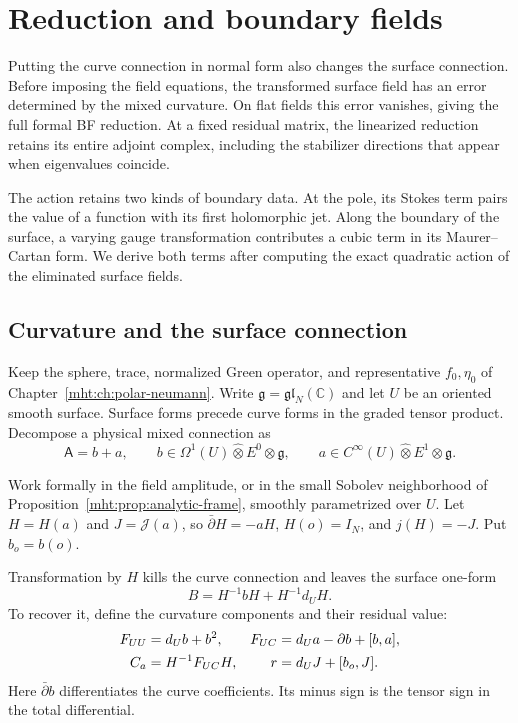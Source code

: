\chapter{Reduction and boundary fields}
\label{mht:ch:neumann-bv}

Putting the curve connection in normal form also changes the surface
connection. Before imposing the field equations, the transformed surface
field has an error determined by the mixed curvature. On flat fields
this error vanishes, giving the full formal BF reduction. At a fixed
residual matrix, the linearized reduction retains its entire adjoint
complex, including the stabilizer directions that appear when
eigenvalues coincide.

The action retains two kinds of boundary data. At the pole, its Stokes
term pairs the value of a function with its first holomorphic jet.
Along the boundary of the surface, a varying gauge transformation
contributes a cubic term in its Maurer--Cartan form. We derive both
terms after computing the exact quadratic action of the eliminated
surface fields.

\section{Curvature and the surface connection}

Keep the sphere, trace, normalized Green operator, and representative
$f_0,\eta_0$ of Chapter~\ref{mht:ch:polar-neumann}.
Write $\mathfrak g=\mathfrak{gl}_N(\mathbb C)$ and let $U$ be an oriented
smooth surface. Surface forms precede curve forms in the graded tensor
product. Decompose a physical mixed connection as
\[
 \mathsf A=b+a,\qquad
 b\in\Omega^1(U)\widehat\otimes E^0\otimes\mathfrak g,\qquad
 a\in C^\infty(U)\widehat\otimes E^1\otimes\mathfrak g.
\]

Work formally in the field amplitude, or in the small Sobolev
neighborhood of Proposition~\ref{mht:prop:analytic-frame}, smoothly
parametrized over $U$. Let $H=H(a)$ and $J=\mathcal J(a)$, so
$\bar\partial H=-aH$, $H(o)=I_N$, and $j(H)=-J$.
Put $b_o=b(o)$.

Transformation by $H$ kills the curve connection and leaves the surface
one-form
\begin{equation}\label{mht:eq:surface-frame}
 B=H^{-1}bH+H^{-1}d_UH.
\end{equation}
To recover it, define the curvature components and their residual value:
\begin{align}
 F_{UU}&=d_Ub+b^2,&
 F_{UC}&=d_Ua-\bar\partial b+[b,a],\label{mht:eq:mixed-curvature}\\
 C_a&=H^{-1}F_{UC}H,&
 r&=d_UJ+[b_o,J].\notag
\end{align}
Here $\bar\partial b$ differentiates the curve coefficients. Its minus
sign is the tensor sign in the total differential.

